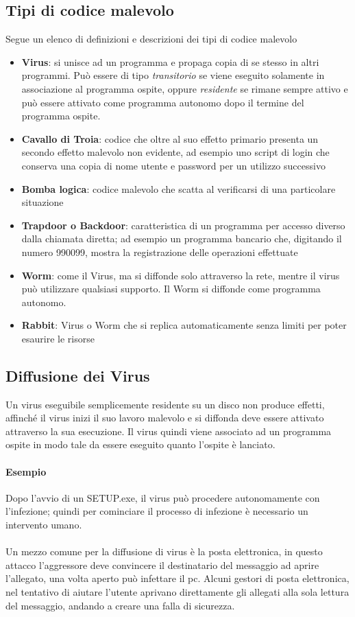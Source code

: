\subsection{Tipi di codice malevolo}
Segue un elenco di definizioni e descrizioni dei tipi di codice malevolo
\begin{itemize}

	\item \textbf{Virus}: si unisce ad un programma e propaga copia di se stesso in altri programmi. Può essere di tipo \emph{transitorio} se viene eseguito solamente in associazione al programma ospite, oppure \emph{residente} se rimane sempre attivo e può essere attivato come programma autonomo dopo il termine del programma ospite.
	\item \textbf{Cavallo di Troia}: codice che oltre al suo effetto primario presenta un secondo effetto malevolo non evidente, ad esempio uno script di login che conserva una copia di nome utente e password per un utilizzo successivo
	\item \textbf{Bomba logica}: codice malevolo che scatta al verificarsi di una particolare situazione
	\item \textbf{Trapdoor o Backdoor}: caratteristica di un programma per accesso diverso dalla chiamata diretta; ad esempio un programma bancario che, digitando il numero 990099, mostra la registrazione delle operazioni effettuate
	\item \textbf{Worm}: come il Virus, ma si diffonde solo attraverso la rete, mentre il virus può utilizzare qualsiasi supporto. Il Worm si diffonde come programma autonomo.
	\item \textbf{Rabbit}: Virus o Worm che si replica automaticamente senza limiti per poter esaurire le risorse
\end{itemize}

\subsection{Diffusione dei Virus}
Un virus eseguibile semplicemente residente su un disco non produce effetti, affinché il virus inizi il suo lavoro malevolo e si diffonda deve essere attivato attraverso la sua esecuzione. Il virus quindi viene associato ad un programma ospite in modo tale da essere eseguito quanto l'ospite è lanciato.
\paragraph{Esempio}
Dopo l'avvio di un SETUP.exe, il virus può procedere autonomamente con l'infezione; quindi per cominciare il processo di infezione è necessario un intervento umano. \\ \\
Un mezzo comune per la diffusione di virus è la posta elettronica, in questo attacco l'aggressore deve convincere il destinatario del messaggio ad aprire l'allegato, una volta aperto può infettare il pc.
Alcuni gestori di posta elettronica, nel tentativo di aiutare l'utente aprivano direttamente gli allegati alla sola lettura del messaggio, andando a creare una falla di sicurezza.

